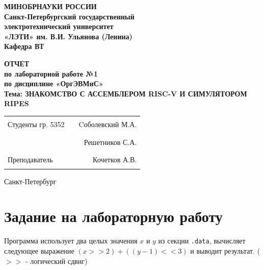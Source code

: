 \documentclass[12pt]{extarticle}
\begin{document}
\begin{center}
  \textbf{МИНОБРНАУКИ РОССИИ} \\
  \textbf{Санкт-Петербургский государственный} \\
  \textbf{электротехнический университет} \\
  \textbf{«ЛЭТИ» им. В.И. Ульянова (Ленина)} \\
  \textbf{Кафедра ВТ} \\
\end{center}

\vspace{0.25\textheight}

\begin{center}
\textbf{ОТЧЕТ} \\
\textbf{по лабораторной работе №1} \\
\textbf{по дисциплине «ОргЭВМиС»} \\
\textbf{Тема: ЗНАКОМСТВО С АССЕМБЛЕРОМ RISC-V И СИМУЛЯТОРОМ RIPES} \\
\end{center}

\vspace*{\fill}

\begin{center}
\begin{tabularx}{\textwidth}{ l X r }
 Студенты гр. 5352 & \rule{8cm}{0.2mm} & Cоболевский М.А. \\
 & \rule{8cm}{0.2mm} & Решетников С.А. \\
 Преподаватель & \rule{8cm}{0.2mm} & Кочетков А.В. \\
\end{tabularx}
\end{center}

\vspace{3em}

\begin{center}
Санкт-Петербург\\
\the\year
\end{center}

\thispagestyle{empty}

\pagebreak

\section{Задание на лабораторную работу}

Программа использует два целых значения $x$ и $y$ из секции \texttt{.data}, вычисляет
следующее выражение $(x >> 2) + ((y - 1) << 3)$ и выводит результат.
($>>$ - логический сдвиг)
\end{document}
